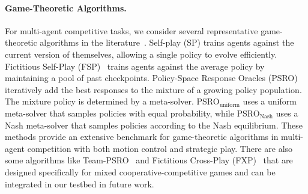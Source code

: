 \paragraph{Game-Theoretic Algorithms.}
For multi-agent competitive tasks, we consider several representative game-theoretic algorithms in the literature~\cite{zhang2024survey}. Self-play (SP) trains agents against the current version of themselves, allowing a single policy to evolve efficiently. Fictitious Self-Play (FSP)~\cite{heinrich2015fictitious} trains agents against the average policy by maintaining a pool of past checkpoints. Policy-Space Response Oracles (PSRO)~\cite{lanctot2017unified} iteratively add the best responses to the mixture of a growing policy population. The mixture policy is determined by a meta-solver. PSRO$_\text{uniform}$ uses a uniform meta-solver that samples policies with equal probability, while PSRO$_\text{Nash}$ uses a Nash meta-solver that samples policies according to the Nash equilibrium. These methods provide an extensive benchmark for game-theoretic algorithms in multi-agent competition with both motion control and strategic play. There are also some algorithms like Team-PSRO~\cite{mcaleer2023team} and Fictitious Cross-Play (FXP)~\cite{xu2023fictitious} that are designed specifically for mixed cooperative-competitive games and can be integrated in our testbed in future work.

